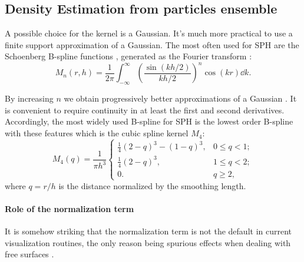 

\subsection{Density Estimation from particles ensemble}\label{sec:density_estimation}
A possible choice for the kernel is a Gaussian.
It's much more practical to use a finite support approximation of a Gaussian.
The most often used for SPH are the Schoenberg  B-spline functions \citep{Schoenberg1946}, generated as the Fourier transform \citep{Monaghan1985, Monaghan2005, Price2012}:
\begin{equation}
M_n(r, h) = \frac{1}{2\pi}\int_{-\infty}^{\infty}{\left(\frac{\sin(kh/2)}{kh/2}\right)^n\cos(kr)\dd{k}}.
\end{equation}

By increasing $n$ we obtain progressively better approximations of a Gaussian \citep[see Section 13.3 of][]{Easton2010}.
It is convenient to require continuity in at least the first and second derivatives.
Accordingly, the most widely used B-spline for SPH is the lowest order B-spline with these features which is the cubic spline kernel $M_4$:
\begin{equation}
M_4(q) = \frac{1}{\pi h^3} \left\{
\begin{array}{ll}
\frac{1}{4}(2-q)^3 - (1 - q)^{3}, & 0 \le q < 1; \\
\frac{1}{4}(2-q)^3, & 1 \le q < 2; \\
0. & q \ge 2,
\end{array}
\right.
\label{eq:cubicspline}
\end{equation}
where $q=r/h$ is the distance normalized by the smoothing length.

\paragraph{Role of the normalization term}
It is somehow striking that the normalization term is not the default in current visualization routines, the only reason being spurious effects when dealing with free surfaces \citep{Price2007}.

